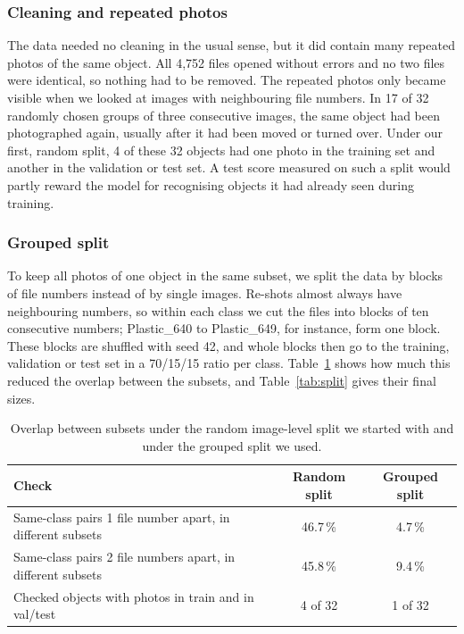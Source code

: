 \documentclass{article}
\begin{document}
\subsubsection{Cleaning and repeated photos}

The data needed no cleaning in the usual sense, but it did contain many repeated photos of the same object. All 4,752 files opened without errors and no two files were identical, so nothing had to be removed. The repeated photos only became visible when we looked at images with neighbouring file numbers. In 17 of 32 randomly chosen groups of three consecutive images, the same object had been photographed again, usually after it had been moved or turned over. Under our first, random split, 4 of these 32 objects had one photo in the training set and another in the validation or test set. A test score measured on such a split would partly reward the model for recognising objects it had already seen during training.

\subsubsection{Grouped split}

To keep all photos of one object in the same subset, we split the data by blocks of file numbers instead of by single images. Re-shots almost always have neighbouring numbers, so within each class we cut the files into blocks of ten consecutive numbers; Plastic\_640 to Plastic\_649, for instance, form one block. These blocks are shuffled with seed 42, and whole blocks then go to the training, validation or test set in a 70/15/15 ratio per class. Table~\ref{tab:leak} shows how much this reduced the overlap between the subsets, and Table~\ref{tab:split} gives their final sizes.

\begin{table}[H]
\centering
\caption{Overlap between subsets under the random image-level split we started with and under the grouped split we used.}
\label{tab:leak}
\begin{tabularx}{\textwidth}{Xcc}
\toprule
Check & Random split & Grouped split \\
\midrule
Same-class pairs 1 file number apart, in different subsets & 46.7\,\% & 4.7\,\% \\
Same-class pairs 2 file numbers apart, in different subsets & 45.8\,\% & 9.4\,\% \\
Checked objects with photos in train and in val/test & 4 of 32 & 1 of 32 \\
\bottomrule
\end{tabularx}
\end{table}
\end{document}

